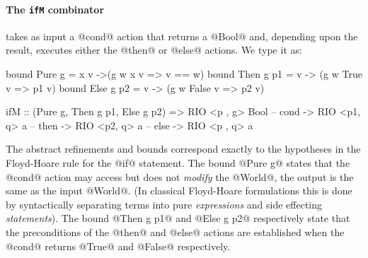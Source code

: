 \paragraph{The \texttt{ifM} combinator} 
takes as input a @cond@ action that returns a @Bool@ and,
depending upon the result, executes either
the @then@ or @else@ actions. We type it as:
%
\begin{code}
  bound Pure g = \w x v  ->(g w x v => v == w)
  bound Then g p1 = \w v -> (g w True  v => p1 v)
  bound Else g p2 = \w v -> (g w False v => p2 v)

  ifM :: (Pure g, Then g p1, Else g p2)
      => RIO <p , g> Bool       -- cond
      -> RIO <p1, q> a          -- then
      -> RIO <p2, q> a          -- else
      -> RIO <p , q> a
\end{code}
%
The abstract refinements and bounds 
correspond exactly to the hypotheses in the 
Floyd-Hoare rule for the @if@ statement.
%
The bound @Pure g@ states that the @cond@ 
action may access but does not \emph{modify} 
the @World@, \ie the output is the same 
as the input @World@. (In classical Floyd-Hoare 
formulations this is done by syntactically 
separating terms into pure \emph{expressions} 
and side effecting \emph{statements}).
%
The bound @Then g p1@ and @Else g p2@ respectively
state that the preconditions of the @then@ and @else@
actions are established when the @cond@ returns @True@
and @False@ respectively. 




